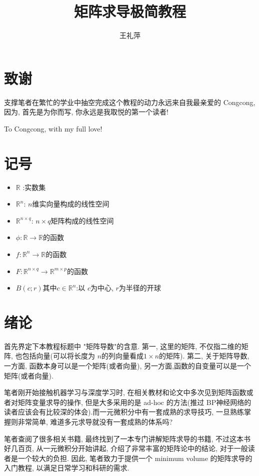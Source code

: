 \documentclass{ctexbook}
\begin{document}
\title{矩阵求导极简教程}
\author{王礼萍}
\maketitle
\tableofcontents
\chapter{致谢}
支撑笔者在繁忙的学业中抽空完成这个教程的动力永远来自我最亲爱的 Congcong, 因为, 首先是为你而写, 你永远是我取悦的第一个读者!


To Congcong, with my full love!
\chapter{记号}
\begin{itemize}
  \item $\mathbb R$ :实数集
  \item $\mathbb R^n$: $n$维实向量构成的线性空间
  \item $\mathbb R^{n\times q}$: $n\times q$矩阵构成的线性空间
  \item $\phi : \mathbb R \rightarrow \mathbb R$的函数
  \item $f : \mathbb R^n \rightarrow \mathbb R$的函数
  \item $F : \mathbb R^{n\times q} \rightarrow \mathbb R^{m\times p}$的函数
  \item $B(c;r)$其中$c\in \mathbb R^n$:以 $c$为中心, $r$为半径的开球
\end{itemize}


\chapter{绪论}
首先界定下本教程标题中 "矩阵导数"的含意. 第一, 这里的矩阵, 不仅指二维的矩阵, 也包括向量(可以将长度为 $n$的列向量看成$1\times n$的矩阵). 第二, 关于矩阵导数, 一方面, 函数本身可以是一个矩阵(或者向量), 另一方面,函数的自变量可以是一个矩阵(或者向量).


笔者刚开始接触机器学习与深度学习时, 在相关教材和论文中多次见到矩阵函数或者对矩阵变量求导的操作, 但是大多采用的是 ad-hoc 的方法(推过 BP神经网络的读者应该会有比较深的体会).而一元微积分中有一套成熟的求导技巧, 一旦熟练掌握则非常简单, 难道多元求导就没有一套成熟的体系吗?


笔者查阅了很多相关书籍, 最终找到了一本专门讲解矩阵求导的书籍\cite{magnus99}, 不过这本书好几百页, 从一元微积分开始讲起, 介绍了非常丰富的矩阵论中的结论, 对于一般读者是一个较大的负担. 因此, 笔者致力于提供一个 minimum volume 的矩阵求导的入门教程, 以满足日常学习和科研的需求.
\end{document}
